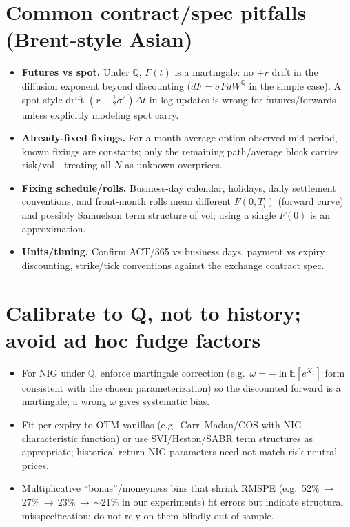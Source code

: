\documentclass[11pt,a4paper]{article}
\begin{document}
\section{Common contract/spec pitfalls (Brent-style Asian)}
\begin{itemize}
  \item \textbf{Futures vs spot.} Under $\mathbb{Q}$, $F(t)$ is a martingale: no $+r$ drift in the diffusion exponent beyond discounting ($dF=\sigma F dW^{\mathbb{Q}}$ in the simple case). A spot-style drift $ (r-\tfrac{1}{2}\sigma^2)\Delta t$ in log-updates is wrong for futures/forwards unless explicitly modeling spot carry.
  \item \textbf{Already-fixed fixings.} For a month-average option observed mid-period, known fixings are constants; only the remaining path/average block carries risk/vol---treating all $N$ as unknown overprices.
  \item \textbf{Fixing schedule/rolls.} Business-day calendar, holidays, daily settlement conventions, and front-month rolls mean different $F(0,T_i)$ (forward curve) and possibly Samuelson term structure of vol; using a single $F(0)$ is an approximation.
  \item \textbf{Units/timing.} Confirm ACT/365 vs business days, payment vs expiry discounting, strike/tick conventions against the exchange contract spec.
\end{itemize}

\section{Calibrate to Q, not to history; avoid ad hoc fudge factors}
\begin{itemize}
  \item For NIG under $\mathbb{Q}$, enforce martingale correction (e.g.\ $\omega = -\ln \mathbb{E}[e^{X_1}]$ form consistent with the chosen parameterization) so the discounted forward is a martingale; a wrong $\omega$ gives systematic bias.
  \item Fit per-expiry to OTM vanillas (e.g.\ Carr--Madan/COS with NIG characteristic function) or use SVI/Heston/SABR term structures as appropriate; historical-return NIG parameters need not match risk-neutral prices.
  \item Multiplicative ``bonus''/moneyness bins that shrink RMSPE (e.g.\ 52\%\,$\to$\,27\%\,$\to$\,23\%\,$\to$\,$\sim$21\% in our experiments) fit errors but indicate structural misspecification; do not rely on them blindly out of sample.
\end{itemize}
\end{document}
